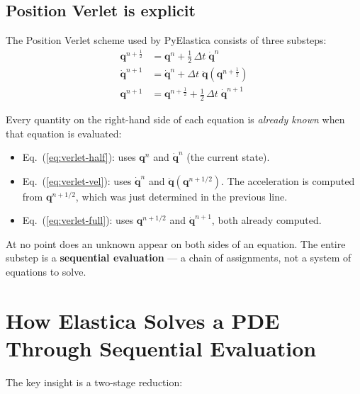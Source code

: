 \documentclass[11pt]{article}
\newcommand{\vect}[1]{\mathbf{#1}}
\begin{document}
\subsection{Position Verlet is explicit}

The Position Verlet scheme used by PyElastica consists of three substeps:
\begin{subequations}
\label{eq:verlet}
\begin{align}
  \vect{q}^{n+\frac{1}{2}} &= \vect{q}^n
    + \tfrac{1}{2}\,\Delta t\;\dot{\vect{q}}^n
  \label{eq:verlet-half} \\[4pt]
  \dot{\vect{q}}^{n+1} &= \dot{\vect{q}}^n
    + \Delta t\;\ddot{\vect{q}}\!\left(\vect{q}^{n+\frac{1}{2}}\right)
  \label{eq:verlet-vel} \\[4pt]
  \vect{q}^{n+1} &= \vect{q}^{n+\frac{1}{2}}
    + \tfrac{1}{2}\,\Delta t\;\dot{\vect{q}}^{n+1}
  \label{eq:verlet-full}
\end{align}
\end{subequations}

Every quantity on the right-hand side of each equation is \emph{already known} when that equation is evaluated:
\begin{itemize}
  \item Eq.~(\ref{eq:verlet-half}): uses $\vect{q}^n$ and $\dot{\vect{q}}^n$ (the current state).
  \item Eq.~(\ref{eq:verlet-vel}): uses $\dot{\vect{q}}^n$ and $\ddot{\vect{q}}(\vect{q}^{n+1/2})$. The acceleration is computed from $\vect{q}^{n+1/2}$, which was just determined in the previous line.
  \item Eq.~(\ref{eq:verlet-full}): uses $\vect{q}^{n+1/2}$ and $\dot{\vect{q}}^{n+1}$, both already computed.
\end{itemize}

\noindent
At no point does an unknown appear on both sides of an equation.
The entire substep is a \textbf{sequential evaluation} --- a chain of assignments, not a system of equations to solve.

\section{How Elastica Solves a PDE Through Sequential Evaluation}
\label{sec:how}

The key insight is a two-stage reduction:
\end{document}
